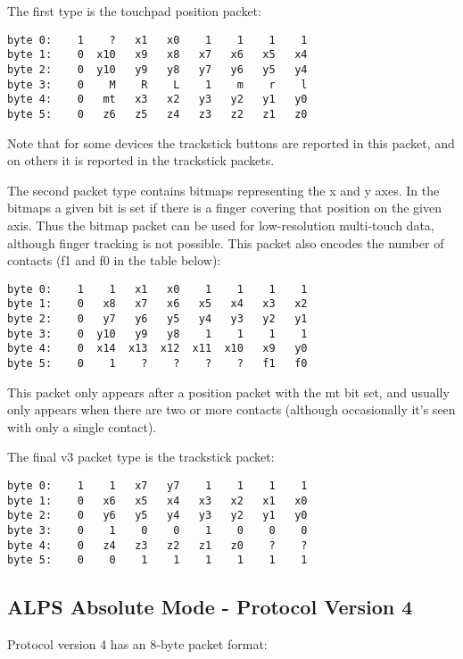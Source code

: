 \documentclass[a4paper,8pt,english]{sphinxmanual}
\begin{document}
The first type is the touchpad position packet:

\begin{Verbatim}[commandchars=\\\{\}]
byte 0:    1    ?   x1   x0    1    1    1    1
byte 1:    0  x10   x9   x8   x7   x6   x5   x4
byte 2:    0  y10   y9   y8   y7   y6   y5   y4
byte 3:    0    M    R    L    1    m    r    l
byte 4:    0   mt   x3   x2   y3   y2   y1   y0
byte 5:    0   z6   z5   z4   z3   z2   z1   z0
\end{Verbatim}

Note that for some devices the trackstick buttons are reported in this packet,
and on others it is reported in the trackstick packets.

The second packet type contains bitmaps representing the x and y axes. In the
bitmaps a given bit is set if there is a finger covering that position on the
given axis. Thus the bitmap packet can be used for low-resolution multi-touch
data, although finger tracking is not possible.  This packet also encodes the
number of contacts (f1 and f0 in the table below):

\begin{Verbatim}[commandchars=\\\{\}]
byte 0:    1    1   x1   x0    1    1    1    1
byte 1:    0   x8   x7   x6   x5   x4   x3   x2
byte 2:    0   y7   y6   y5   y4   y3   y2   y1
byte 3:    0  y10   y9   y8    1    1    1    1
byte 4:    0  x14  x13  x12  x11  x10   x9   y0
byte 5:    0    1    ?    ?    ?    ?   f1   f0
\end{Verbatim}

This packet only appears after a position packet with the mt bit set, and
usually only appears when there are two or more contacts (although
occasionally it's seen with only a single contact).

The final v3 packet type is the trackstick packet:

\begin{Verbatim}[commandchars=\\\{\}]
byte 0:    1    1   x7   y7    1    1    1    1
byte 1:    0   x6   x5   x4   x3   x2   x1   x0
byte 2:    0   y6   y5   y4   y3   y2   y1   y0
byte 3:    0    1    0    0    1    0    0    0
byte 4:    0   z4   z3   z2   z1   z0    ?    ?
byte 5:    0    0    1    1    1    1    1    1
\end{Verbatim}


\subsection{ALPS Absolute Mode - Protocol Version 4}
\label{input/devices/alps:alps-absolute-mode-protocol-version-4}
Protocol version 4 has an 8-byte packet format:
\end{document}
